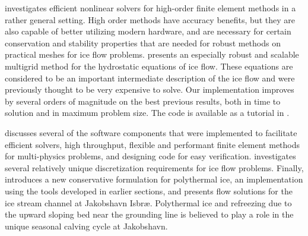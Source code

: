  investigates efficient nonlinear solvers for high-order finite element methods in a rather general setting.
High order methods have accuracy benefits, but they are also capable of better utilizing modern hardware, and are necessary for certain conservation and stability properties that are needed for robust methods on practical meshes for ice flow problems.
 presents an especially robust and scalable multigrid method for the hydrostatic equations of ice flow.
These equations are considered to be an important intermediate description of the ice flow and were previously thought to be very expensive to solve.
Our implementation improves by several orders of magnitude on the best previous results, both in time to solution and in maximum problem size.
The code is available as a tutorial in {\PETSc}.

 discusses several of the software components that were implemented to facilitate efficient solvers, high throughput, flexible and performant finite element methods for multi-physics problems, and designing code for easy verification.
 investigates several relatively unique discretization requirements for ice flow problems.
Finally,  introduces a new conservative formulation for polythermal ice, an implementation using the tools developed in earlier sections, and presents flow solutions for the ice stream channel at Jakobshavn Isbr{\ae}.
Polythermal ice and refreezing due to the upward sloping bed near the grounding line is believed to play a role in the unique seasonal calving cycle at Jakobshavn.
